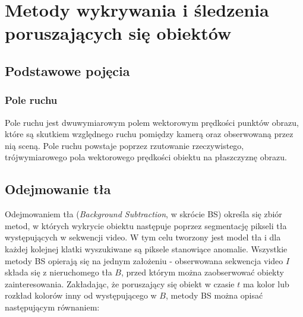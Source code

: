 \chapter{Metody wykrywania i śledzenia poruszających się obiektów}
\label{cha:Metody_wykrywania_i_sledzenia_poruszajacych_sie_obiektow}


\section{Podstawowe pojęcia}
\label{sec:podstawowePoj}

\subsection{Pole ruchu \cite{Trucco1998}}
\label{subsec:poleRuchu}
Pole ruchu jest dwuwymiarowym polem wektorowym prędkości punktów obrazu, które są skutkiem względnego ruchu pomiędzy kamerą oraz obserwowaną przez nią sceną. Pole ruchu powstaje poprzez rzutowanie rzeczywistego, trójwymiarowego pola wektorowego prędkości obiektu na płaszczyznę obrazu.


\section{Odejmowanie tła \cite{Benezeth2008}}
\label{sec:odejmowanieTla}
Odejmowaniem tła (\textit{Background Subtraction}, w skrócie BS) określa się zbiór metod, w których wykrycie obiektu następuje poprzez segmentację pikseli tła występujących w sekwencji video. W tym celu tworzony jest model tła i dla każdej kolejnej klatki wyszukiwane są piksele stanowiące anomalie. Wszystkie metody BS opierają się na jednym założeniu - obserwowana sekwencja video $I$ składa się z nieruchomego tła $B$, przed którym można zaobserwować obiekty zainteresowania. Zakładając, że poruszający się obiekt w czasie $t$ ma kolor lub rozkład kolorów inny od występującego w $B$, metody BS można opisać następującym równaniem:

